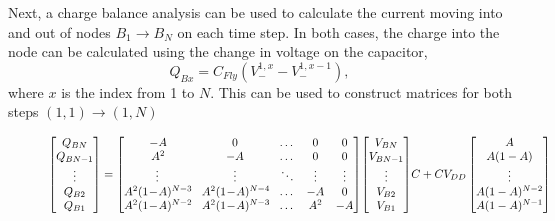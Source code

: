 \documentclass[conference]{IEEEtran}
\begin{document}
	Next, a charge balance analysis can be used to calculate the current moving into and out of nodes $B_1 \rightarrow B_N$ on each time step. In both cases, the charge into the node can be calculated using the change in voltage on the capacitor,
	\begin{equation}
	Q_{Bx} = C_{Fly}(V_-^{1,x} - V_-^{1,x-1}),
	\end{equation}
	where $x$ is the index from 1 to $N$. This can be used to construct matrices for both steps $(1,1)\rightarrow(1,N)$
	\begin{figure}
	\begin{equation}
	\begin{bmatrix}
	Q_{BN} \\
	Q_{BN-1} \\
	\vdots\\
	Q_{B2} \\ 
	Q_{B1}
	\end{bmatrix}
	=
	\begin{bmatrix}
	-A \!& 0 & \dots & 0 & 0 \\
	A^2 \!& -A & \dots & 0 & 0\\
	\vdots & \vdots & \ddots & \vdots & \vdots \\
	A^2(1\!-\!A)^{N-3} \!& A^2(1\!-\!A)^{N-4} \!& \dots & -A & 0\\ 
	A^2(1\!-\!A)^{N-2} \!& A^2(1\!-\!A)^{N-3} \!& \dots & A^2 & -A 
	\end{bmatrix}\!\begin{bmatrix}
	V_{BN} \\
	V_{BN-1} \\
	\vdots \\
	V_{B2} \\
	V_{B1}
	\end{bmatrix}\!C\\+CV_{DD}\begin{bmatrix}
	A \\
	A(1-A) \\
	\vdots \\
	A(1-A)^{N-2} \\
	A(1-A)^{N-1}
	\end{bmatrix}
	\label{eq:Q_V1}
	\end{equation}	
	\end{figure}
	
\end{document}

